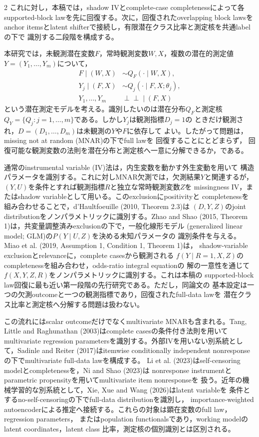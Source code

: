 \documentclass[a4paper,10pt]{article}
\newcommand{\indep}{\mathrel{\perp\!\!\!\perp}}
\begin{document}
\begin{multicols}{2}
これに対し，本稿では，shadow IVとcomplete-case completenessによって各
supported-block lawを先に回復する。次に，回復されたoverlapping block lawsを
anchor itemsとlatent shifterで接続し，有限潜在クラス比率と測定核を共通labelの下で
識別する二段階を構成する。

本研究では，未観測潜在変数$F$，常時観測変数$W,X$，複数の潜在的測定値
$Y=(Y_1,\ldots,Y_m)$について，
\begin{align}
F\mid(W,X)&\sim Q_F(\cdot\mid W,X),\\
Y_j\mid(F,X)&\sim Q_j(\cdot\mid F,X;\theta_j),\\
Y_1,\ldots,Y_m&\indep\mid(F,X)
\end{align}
という潜在測定モデルを考える。識別したいのは潜在分布$Q_F$と測定核
$Q_Y=\{Q_j:j=1,\ldots,m\}$である。しかし$Y_j$は観測指標$D_j=1$の
ときだけ観測され，$D=(D_1,\ldots,D_m)$は未観測の$Y$や$F$に依存して
よい。したがって問題は，missing not at random (MNAR)の下でfull lawを
回復することにとどまらず，
回復可能な観測変数の法則を潜在分布と測定核へ一意に分解できるか，である。

通常のinstrumental variable (IV)法は，内生変数を動かす外生変動を用いて
構造パラメータを識別する。これに対しMNAR欠測では，欠測結果$Y$と関連するが，
$(Y,U)$を条件とすれば観測指標$R$と独立な常時観測変数$Z$を
missingness IV，またはshadow variableとして用いる。このexclusionにpositivityと
completenessを組み合わせることで，d'Haultfoeuille (2010, Theorem 2.3)は
$(D,Y,Z)$のjoint distributionをノンパラメトリックに識別する。Zhao and Shao
(2015, Theorem 1)は，共変量調整済みexclusionの下で，一般化線形モデル
(generalized linear model; GLM)の$P(Y\mid U,Z)$を決める未知パラメータの
識別条件を与える。Miao et al. (2019, Assumption 1, Condition 1, Theorem 1)は，
shadow-variable exclusionとrelevanceに，complete casesから観測される
$f(Y\mid R=1,X,Z)$のcompletenessを組み合わせ，odds-ratio integral equationの
解の一意性を通じて$f(X,Y,Z,R)$をノンパラメトリックに識別する。これは本稿の
supported-block law回復に最も近い第一段階の先行研究である。ただし，同論文の
基本設定は一つの欠測outcomeと一つの観測指標であり，回復されたfull-data lawを
潜在クラス比率と測定核へ分解する問題は扱わない。

この流れにはscalar outcomeだけでなくmultivariate MNARも含まれる。Tang, Little and
Raghunathan (2003)はcomplete casesの条件付き法則を用いてmultivariate regression
parametersを識別する。外部IVを用いない別系統として，Sadinle and Reiter (2017)はitemwise
conditionally independent nonresponseの下でmultivariate full-data lawを構成する。
Li et al. (2023)はself-censoring modelとcompletenessを，Ni and Shao (2023)は
nonresponse instrumentとparametric propensityを用いてmultivariate item nonresponseを
扱う。近年の機械学習的な別系統として，Xie, Xue and Wang (2026)はlatent variableを
条件とするno-self-censoringの下でfull-data distributionを識別し，
importance-weighted autoencoderによる推定へ接続する。これらの対象は顕在変数のfull law，regression parameters，
またはpopulation functionalsであり，working modelのlatent coordinates，latent class
比率，測定核の個別識別とは区別される。


\end{multicols}
\end{document}
